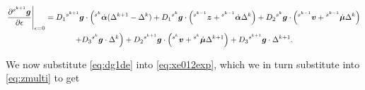 \documentclass[../DC2017114Bouma.tex]{subfiles}
\begin{document}
\begin{multline}
\left.\frac{\partial\hspace{0cm}^{s^{k+1}}{\boldsymbol{g}}}{\partial\epsilon}\right|_{\epsilon=0} = D_1\hspace{0cm}^{s^{k+1}}{\boldsymbol{g}}\cdot\left(\hspace{0cm}^{s^k}\dot{\boldsymbol{\alpha}}(\Delta^{k+1}-\Delta^{k}) + D_1\hspace{0cm}^{s^k}{\boldsymbol{g}}\cdot\left(\hspace{0cm}^{s^{k-1}}{\boldsymbol{z}}+\hspace{0cm}^{s^{k-1}}\dot{\boldsymbol{\alpha}}\Delta^{k}\right) + D_2\hspace{0cm}^{s^k}{\boldsymbol{g}}\cdot\left(\hspace{0cm}^{s^{k-1}}{\boldsymbol{v}}+\hspace{0cm}^{s^{k-1}}\dot{\boldsymbol{\mu}}\Delta^{k}\right) \right. \\ \left. + D_3\hspace{0cm}^{s^k}{\boldsymbol{g}}\cdot\Delta^{k}\right)+ D_2 \hspace{0cm}^{s^{k+1}}{\boldsymbol{g}}\cdot\left(\hspace{0cm}^{s^{k}}{\boldsymbol{v}}+\hspace{0cm}^{s^{k}}\dot{\boldsymbol{\mu}}\Delta^{k+1} \right) + D_3\hspace{0cm}^{s^{k+1}}{\boldsymbol{g}}\cdot\Delta^{k+1}. \label{eq:dg1de}
\end{multline}


We now substitute \eqref{eq:dg1de} into \eqref{eq:xe012exp}, which we in turn substitute into \eqref{eq:zmulti} to get
\end{document}
